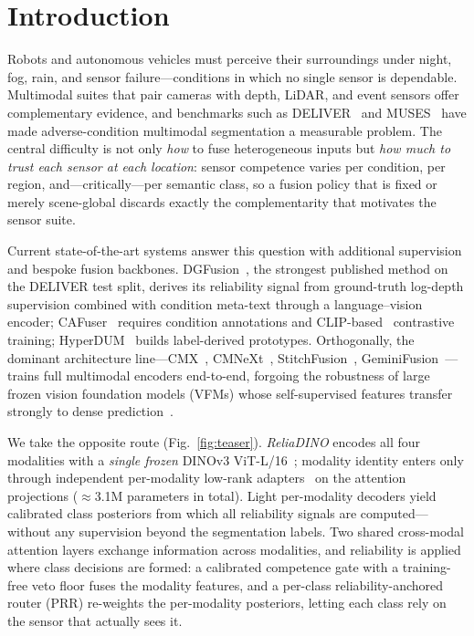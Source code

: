 \section{Introduction}
\label{sec:intro}

Robots and autonomous vehicles must perceive their surroundings under night, fog, rain, and sensor failure---conditions in which no single sensor is dependable. Multimodal suites that pair cameras with depth, LiDAR, and event sensors offer complementary evidence, and benchmarks such as DELIVER~\cite{cmnext2023} and MUSES~\cite{muses2024} have made adverse-condition multimodal segmentation a measurable problem. The central difficulty is not only \emph{how} to fuse heterogeneous inputs but \emph{how much to trust each sensor at each location}: sensor competence varies per condition, per region, and---critically---per semantic class, so a fusion policy that is fixed or merely scene-global discards exactly the complementarity that motivates the sensor suite.

Current state-of-the-art systems answer this question with additional supervision and bespoke fusion backbones. DGFusion~\cite{dgfusion2026}, the strongest published method on the DELIVER test split, derives its reliability signal from ground-truth log-depth supervision combined with condition meta-text through a language--vision encoder; CAFuser~\cite{cafuser2025} requires condition annotations and CLIP-based~\cite{clip2021} contrastive training; HyperDUM~\cite{hyperdum2025} builds label-derived prototypes. Orthogonally, the dominant architecture line---CMX~\cite{cmx2023}, CMNeXt~\cite{cmnext2023}, StitchFusion~\cite{stitchfusion2024}, GeminiFusion~\cite{geminifusion2024}---trains full multimodal encoders end-to-end, forgoing the robustness of large frozen vision foundation models (VFMs) whose self-supervised features transfer strongly to dense prediction~\cite{dinov3_2025}.

We take the opposite route (Fig.~\ref{fig:teaser}). \emph{ReliaDINO} encodes all four modalities with a \emph{single frozen} DINOv3 ViT-L/16~\cite{dinov3_2025}; modality identity enters only through independent per-modality low-rank adapters~\cite{lora2022} on the attention projections ($\approx$3.1M parameters in total). Light per-modality decoders yield calibrated class posteriors from which all reliability signals are computed---without any supervision beyond the segmentation labels. Two shared cross-modal attention layers exchange information across modalities, and reliability is applied where class decisions are formed: a calibrated competence gate with a training-free veto floor fuses the modality features, and a per-class reliability-anchored router (PRR) re-weights the per-modality posteriors, letting each class rely on the sensor that actually sees it.

